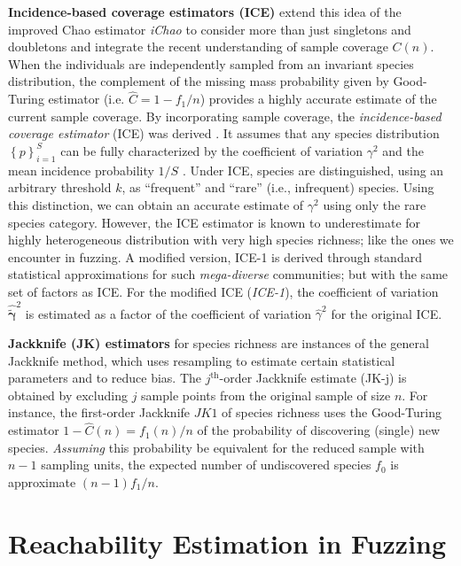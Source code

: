 \documentclass[conference]{IEEEtran}
\begin{document}
\textbf{Incidence-based coverage estimators (ICE)} extend this idea of the improved Chao estimator \emph{iChao} to consider more than just singletons and doubletons and integrate the recent understanding of sample coverage $C(n)$. When the individuals are independently sampled from an invariant species distribution, the complement of the missing mass probability given by {Good-Turing estimator} \cite{good1953} (i.e. $\hat C = 1-f_1/n$) provides a highly accurate estimate of the current sample coverage. By incorporating sample coverage, the \emph{incidence-based coverage estimator} (ICE) was derived \cite{lee1994}. It assumes that any species distribution $\left\{p\right\}_{i=1}^S$ can be fully characterized by the coefficient of variation $\gamma^2$ and the mean incidence probability $1/S$ \cite{chao2014species}. Under ICE, species are distinguished, using an arbitrary threshold $k$, as ``frequent'' and ``rare'' (i.e., infrequent) species. Using this distinction, we can obtain an accurate estimate of $\gamma^2$ using only the rare species category. However, the ICE estimator is known to underestimate for highly heterogeneous distribution with very high species richness; like the ones we encounter in fuzzing. A modified version, ICE-1 \cite{gotelli2013} is derived through standard statistical approximations for such \emph{mega-diverse} communities; but with the same set of factors as ICE. For the modified ICE (\emph{ICE-1}), the coefficient of variation $\bm{\hat{\tilde \gamma}}^2$ is estimated as a factor of the coefficient of variation $\hat \gamma^2$ for the original ICE.

\textbf{Jackknife (JK) estimators} for species richness are instances of the general Jackknife method, which uses resampling to estimate certain statistical parameters and to reduce bias. The $j^\text{th}$-order Jackknife estimate (JK-j) is obtained by excluding $j$ sample points from the original sample of size $n$. For instance, the first-order Jackknife $JK1$ of species richness \cite{burnham1978} uses the Good-Turing estimator $1-\widehat{C}(n)=f_1(n)/n$ of the probability of discovering (single) new species. \emph{Assuming} this probability be equivalent for the reduced sample with $n-1$ sampling units, the expected number of undiscovered species $f_0$ is approximate $(n-1)f_1/n$.

\section{Reachability Estimation in Fuzzing}
\label{sec:reachability}
\end{document}
